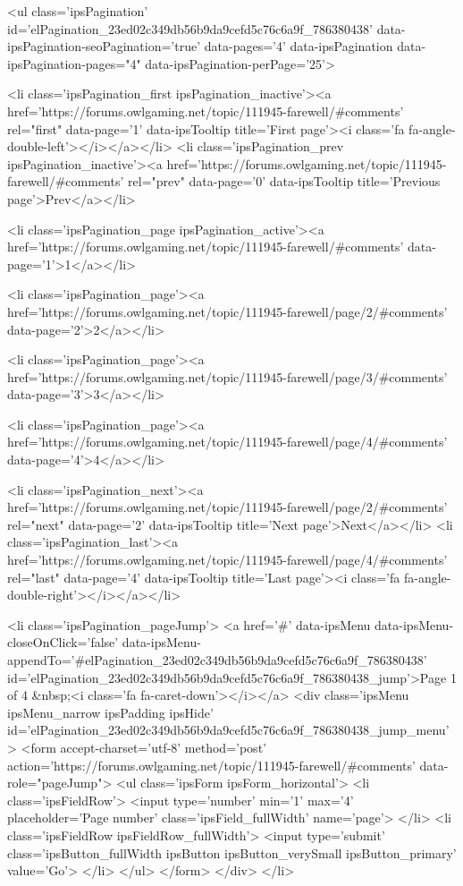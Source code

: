 	
	<ul class='ipsPagination' id='elPagination_23ed02c349db56b9da9cefd5c76c6a9f_786380438' data-ipsPagination-seoPagination='true' data-pages='4' data-ipsPagination  data-ipsPagination-pages="4" data-ipsPagination-perPage='25'>
		
			
				<li class='ipsPagination_first ipsPagination_inactive'><a href='https://forums.owlgaming.net/topic/111945-farewell/#comments' rel="first" data-page='1' data-ipsTooltip title='First page'><i class='fa fa-angle-double-left'></i></a></li>
				<li class='ipsPagination_prev ipsPagination_inactive'><a href='https://forums.owlgaming.net/topic/111945-farewell/#comments' rel="prev" data-page='0' data-ipsTooltip title='Previous page'>Prev</a></li>
			
			<li class='ipsPagination_page ipsPagination_active'><a href='https://forums.owlgaming.net/topic/111945-farewell/#comments' data-page='1'>1</a></li>
			
				
					<li class='ipsPagination_page'><a href='https://forums.owlgaming.net/topic/111945-farewell/page/2/#comments' data-page='2'>2</a></li>
				
					<li class='ipsPagination_page'><a href='https://forums.owlgaming.net/topic/111945-farewell/page/3/#comments' data-page='3'>3</a></li>
				
					<li class='ipsPagination_page'><a href='https://forums.owlgaming.net/topic/111945-farewell/page/4/#comments' data-page='4'>4</a></li>
				
				<li class='ipsPagination_next'><a href='https://forums.owlgaming.net/topic/111945-farewell/page/2/#comments' rel="next" data-page='2' data-ipsTooltip title='Next page'>Next</a></li>
				<li class='ipsPagination_last'><a href='https://forums.owlgaming.net/topic/111945-farewell/page/4/#comments' rel="last" data-page='4' data-ipsTooltip title='Last page'><i class='fa fa-angle-double-right'></i></a></li>
			
			
				<li class='ipsPagination_pageJump'>
					<a href='#' data-ipsMenu data-ipsMenu-closeOnClick='false' data-ipsMenu-appendTo='#elPagination_23ed02c349db56b9da9cefd5c76c6a9f_786380438' id='elPagination_23ed02c349db56b9da9cefd5c76c6a9f_786380438_jump'>Page 1 of 4 &nbsp;<i class='fa fa-caret-down'></i></a>
					<div class='ipsMenu ipsMenu_narrow ipsPadding ipsHide' id='elPagination_23ed02c349db56b9da9cefd5c76c6a9f_786380438_jump_menu'>
						<form accept-charset='utf-8' method='post' action='https://forums.owlgaming.net/topic/111945-farewell/#comments' data-role="pageJump">
							<ul class='ipsForm ipsForm_horizontal'>
								<li class='ipsFieldRow'>
									<input type='number' min='1' max='4' placeholder='Page number' class='ipsField_fullWidth' name='page'>
								</li>
								<li class='ipsFieldRow ipsFieldRow_fullWidth'>
									<input type='submit' class='ipsButton_fullWidth ipsButton ipsButton_verySmall ipsButton_primary' value='Go'>
								</li>
							</ul>
						</form>
					</div>
				</li>
			
